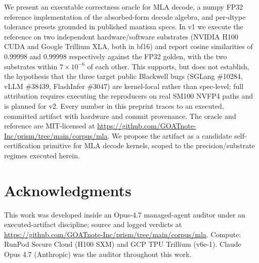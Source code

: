 \documentclass[11pt]{article}
\begin{document}
We present an executable correctness oracle for MLA decode, a numpy
FP32 reference implementation of the absorbed-form decode algebra,
and per-dtype tolerance presets grounded in published mantissa
specs. In v1 we execute the reference on two independent
hardware/software substrates (NVIDIA H100 CUDA and Google Trillium
XLA, both in bf16) and report cosine similarities of $0.99998$ and
$0.99998$ respectively against the FP32 golden, with the two
substrates within $7\times 10^{-6}$ of each other. This supports, but
does not establish, the hypothesis that the three target public
Blackwell bugs (SGLang \#10284, vLLM \#38439, FlashInfer \#3047) are
kernel-local rather than spec-level; full attribution requires
executing the reproducers on real SM100 NVFP4 paths and is planned
for v2. Every number in this preprint traces to an executed,
committed artifact with hardware and commit provenance. The oracle
and reference are MIT-licensed at
\url{https://github.com/GOATnote-Inc/prism/tree/main/corpus/mla}.
We propose the artifact as a candidate self-certification primitive
for MLA decode kernels, scoped to the precision/substrate regimes
executed herein.

\section*{Acknowledgments}

This work was developed inside an Opus-4.7 managed-agent auditor
under an executed-artifact discipline; source and logged verdicts
at \url{https://github.com/GOATnote-Inc/prism/tree/main/corpus/mla}.
Compute: RunPod Secure Cloud (H100 SXM) and GCP TPU Trillium (v6e-1).
Claude Opus 4.7 (Anthropic) was the auditor throughout this work.



\end{document}
